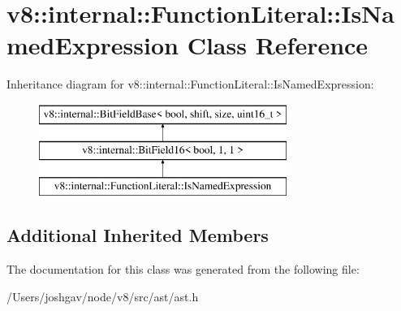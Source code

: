 \hypertarget{classv8_1_1internal_1_1_function_literal_1_1_is_named_expression}{}\section{v8\+:\+:internal\+:\+:Function\+Literal\+:\+:Is\+Named\+Expression Class Reference}
\label{classv8_1_1internal_1_1_function_literal_1_1_is_named_expression}
Inheritance diagram for v8\+:\+:internal\+:\+:Function\+Literal\+:\+:Is\+Named\+Expression\+:\begin{figure}[H]
\begin{center}
\leavevmode
\includegraphics[height=3.000000cm]{classv8_1_1internal_1_1_function_literal_1_1_is_named_expression}
\end{center}
\end{figure}
\subsection*{Additional Inherited Members}


The documentation for this class was generated from the following file\+:\begin{DoxyCompactItemize}
\item 
/\+Users/joshgav/node/v8/src/ast/ast.\+h\end{DoxyCompactItemize}
